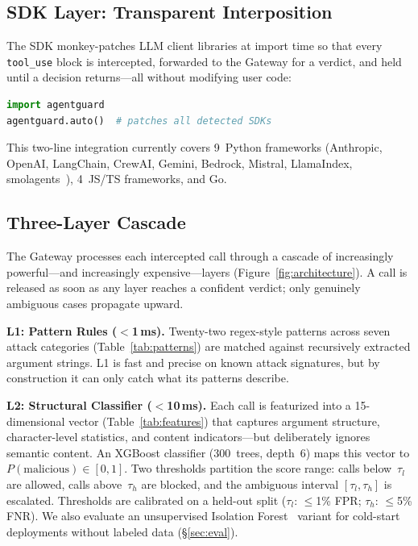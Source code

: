 \documentclass{article}
\begin{document}
\subsection{SDK Layer: Transparent Interposition}

The SDK monkey-patches LLM client libraries at import time so that every \texttt{tool\_use} block is intercepted, forwarded to the Gateway for a verdict, and held until a decision returns---all without modifying user code:

\begin{lstlisting}[language=Python, basicstyle=\scriptsize\ttfamily]
import agentguard
agentguard.auto()  # patches all detected SDKs
\end{lstlisting}

\noindent This two-line integration currently covers 9~Python frameworks (Anthropic, OpenAI, LangChain, CrewAI, Gemini, Bedrock, Mistral, LlamaIndex, smolagents~\citep{smolagents2024}), 4~JS/TS frameworks, and Go.

\subsection{Three-Layer Cascade}
\label{sec:cascade}

The Gateway processes each intercepted call through a cascade of increasingly powerful---and increasingly expensive---layers (Figure~\ref{fig:architecture}).
A call is released as soon as any layer reaches a confident verdict; only genuinely ambiguous cases propagate upward.

\textbf{L1: Pattern Rules ($<$1\,ms).}
Twenty-two regex-style patterns across seven attack categories (Table~\ref{tab:patterns}) are matched against recursively extracted argument strings.
L1 is fast and precise on known attack signatures, but by construction it can only catch what its patterns describe.

\textbf{L2: Structural Classifier ($<$10\,ms).}
Each call is featurized into a 15-dimensional vector (Table~\ref{tab:features}) that captures argument structure, character-level statistics, and content indicators---but deliberately ignores semantic content.
An XGBoost classifier (300~trees, depth~6) maps this vector to $P(\text{malicious}) \in [0,1]$.
Two thresholds partition the score range: calls below~$\tau_l$ are allowed, calls above~$\tau_h$ are blocked, and the ambiguous interval $[\tau_l, \tau_h]$ is escalated.
Thresholds are calibrated on a held-out split ($\tau_l$: $\le$1\% FPR; $\tau_h$: $\le$5\% FNR).
We also evaluate an unsupervised Isolation Forest~\citep{zhao2019pyod} variant for cold-start deployments without labeled data (\S\ref{sec:eval}).
\end{document}

